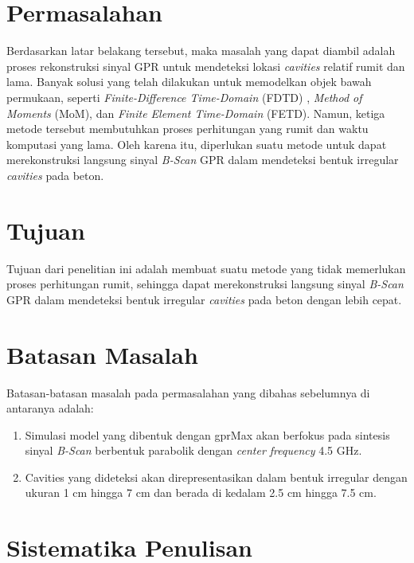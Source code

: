 \section{Permasalahan}
\label{sec:permasalahan}

Berdasarkan latar belakang tersebut, maka masalah yang dapat diambil adalah proses rekonstruksi sinyal GPR untuk mendeteksi lokasi \emph{cavities} relatif rumit dan lama. 
Banyak solusi yang telah dilakukan untuk memodelkan objek bawah permukaan, seperti \emph{Finite-Difference Time-Domain} (FDTD) \parencite{FDTD}, \emph{Method of Moments} (MoM)\parencite{MoM}, dan \emph{Finite Element Time-Domain} (FETD)\parencite{FETD}. 
Namun, ketiga metode tersebut membutuhkan proses perhitungan yang rumit dan waktu komputasi yang lama. 
Oleh karena itu, diperlukan suatu metode untuk dapat merekonstruksi langsung sinyal \emph{B-Scan} GPR dalam mendeteksi bentuk irregular \emph{cavities} pada beton.

\section{Tujuan}
\label{sec:Tujuan}

Tujuan dari penelitian ini adalah membuat suatu metode yang tidak memerlukan proses perhitungan rumit, sehingga dapat merekonstruksi langsung sinyal \emph{B-Scan} GPR dalam mendeteksi bentuk irregular \emph{cavities} pada beton dengan lebih cepat.

\section{Batasan Masalah}
\label{sec:batasanmasalah}

Batasan-batasan masalah pada permasalahan yang dibahas sebelumnya di antaranya adalah:

\begin{enumerate}[nolistsep]

  \item Simulasi model yang dibentuk dengan gprMax akan berfokus pada sintesis sinyal \emph{B-Scan} berbentuk parabolik dengan \emph{center frequency} 4.5 GHz.

  \item Cavities yang dideteksi akan direpresentasikan dalam bentuk irregular dengan ukuran 1 cm hingga 7 cm dan berada di kedalam 2.5 cm hingga 7.5 cm.

\end{enumerate}

\section{Sistematika Penulisan}
\label{sec:sistematikapenulisan}

